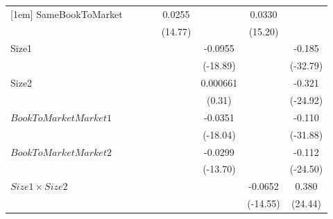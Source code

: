 {\begin{tabular}{l*{7}{c}}
[1em]
SameBookToMarket    &                     &                     &                     &      0.0255\sym{***}&                     &      0.0330\sym{***}&                     \\
                    &                     &                     &                     &     (14.77)         &                     &     (15.20)         &                     \\
[1em]
Size1               &                     &                     &                     &                     &     -0.0955\sym{***}&                     &      -0.185\sym{***}\\
                    &                     &                     &                     &                     &    (-18.89)         &                     &    (-32.79)         \\
[1em]
Size2               &                     &                     &                     &                     &    0.000661         &                     &      -0.321\sym{***}\\
                    &                     &                     &                     &                     &      (0.31)         &                     &    (-24.92)         \\
[1em]
$ BookToMarketMarket1 $&                     &                     &                     &                     &     -0.0351\sym{***}&                     &      -0.110\sym{***}\\
                    &                     &                     &                     &                     &    (-18.04)         &                     &    (-31.88)         \\
[1em]
$ BookToMarketMarket2 $&                     &                     &                     &                     &     -0.0299\sym{***}&                     &      -0.112\sym{***}\\
                    &                     &                     &                     &                     &    (-13.70)         &                     &    (-24.50)         \\
[1em]
$ Size1 \times Size2 $&                     &                     &                     &                     &                     &     -0.0652\sym{***}&       0.380\sym{***}\\
                    &                     &                     &                     &                     &                     &    (-14.55)         &     (24.44)         \\

\end{tabular}}
